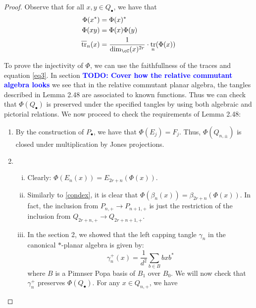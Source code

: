 \documentclass[11pt]{article}
\theoremstyle{plain}
\theoremstyle{definition}
\DeclareMathOperator{\tr}{tr}
\newcommand{\todo}[1]{\textcolor{blue}{\textbf{TODO: #1}}}
\begin{document}
\begin{proof}
Observe that for all $x,y \in Q_{\bullet}$, we have that 
\begin{align}
	\Phi(x^{*}) &= \Phi(x)^{\ast} \\
	\Phi(xy) &= \Phi(x)\Phi(y) \\
	\overline{\tr}_{n}(x) &= \frac{1}{\dim_\cC(x)^{2r}}\cdot\tr_{n}(\Phi(x)) \label{eq3}
\end{align}

	To prove the injectivity of $\Phi$, we can use the faithfullness of the traces and equation \eqref{eq3}.
	In section \todo{Cover how the relative commutant algebra looks} we see that in the relative commutant planar algebra, the tangles described in Lemma 2.48 are associated to known functions. Thus we can check that $\Phi(Q_\bullet)$ is preserved under the specified tangles by using both algebraic and pictorial relations. We now proceed to check the requirements of Lemma 2.48:
\begin{enumerate}[(1)]
\item By the construction of $P_{\bullet}$, we have that $\Phi(E_j)=F_j$. Thus, $\Phi(Q_{n,\pm})$ is closed under multiplication by Jones projections. 
\item \begin{enumerate}[(i)]
\item \label{condex} Clearly: $\Phi(E_n(x)) = E_{2r+n}(\Phi(x))$.
\item Similarly to \eqref{condex}, it is clear that $\Phi(\beta_n(x)) = \beta_{2r+n}(\Phi(x))$. In fact, the inclusion from $P_{n,+} \to P_{n+1,+}$ is just the restriction of the inclusion from $Q_{2r+n,+} \to Q_{2r+n+1,+}$. 
\item In the section 2, %
 we showed that the left capping tangle $\gamma_n$ in the canonical $*$-planar algebra is given by:
\[
 \gamma^{+}_n(x) = \frac{1}{d^2}\sum_{b \in B}bxb^\ast
\]
where $B$ is a Pimnser Popa basis of $B_1$ over $B_0$. We will now check that $\gamma^{+}_n$ preserves $\Phi(Q_{\bullet})$. For any $x \in Q_{n,+}$, we have 


\end{enumerate}
\end{enumerate}
\end{proof}
\end{document}
